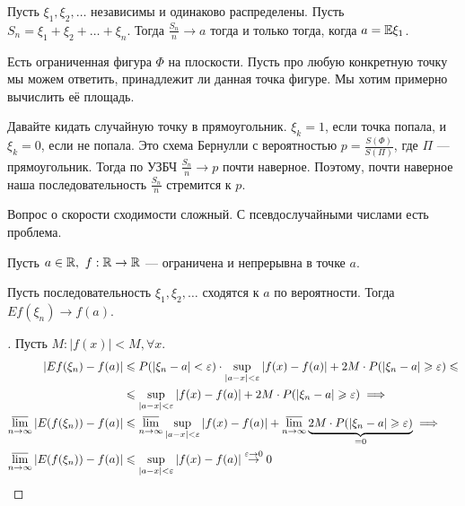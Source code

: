 \documentclass[../main.tex]{subfiles}
\begin{document}
\begin{thm}
 Пусть $ \xi_1, \xi_2, \ldots $  независимы и одинаково распределены. Пусть $ S_n  = \xi_1 + \xi_2 + \ldots + \xi_n $. Тогда $ \frac{S_n}{n} \to a $ тогда и только тогда, когда $ a = \mathbb E \xi_1 $.
\end{thm}

\begin{exmpl}
Есть ограниченная фигура $ \Phi $ на плоскости. Пусть про любую конкретную точку мы можем ответить, принадлежит ли данная точка фигуре. Мы хотим примерно вычислить её площадь.

 Давайте кидать случайную точку в прямоугольник. $ \xi_k = 1 $, если точка попала, и $ \xi_k = 0 $, если не попала. Это схема Бернулли с вероятностью $ p = \frac{S(\Phi)}{S(\Pi)} $, где $ \Pi $ --- прямоугольник. Тогда по УЗБЧ  $ \frac{S_n}{n} \to p $  почти наверное. Поэтому, почти наверное наша последовательность $ \frac{S_n}{n} $ стремится к $ p $.

 Вопрос о скорости сходимости сложный. С псевдослучайными числами есть проблема.
\end{exmpl}

\begin{thm}
	Пусть $a \in \mathbb{R}, \ f : \mathbb{R} \to \mathbb{R}$ --- ограничена и непрерывна в точке $a$.

	Пусть последовательность $\xi_1, \xi_2, \ldots$ сходятся к $a$ по вероятности.
	Тогда $E f(\xi_n) \to f(a)$.
\end{thm}
\begin{proof}[]
	Пусть $M: |f(x)| < M, \forall x$.
  \begin{align*}
	|E f(\xi_n) - f(a)| &\leqslant P(|\xi_n - a| < \varepsilon) \cdot \sup_{|a - x| < \varepsilon} |f(x) - f(a)| + 2M \cdot P(|\xi_n - a| \geqslant \varepsilon) \leqslant \\
	& \leqslant \sup_{|a - x| < \varepsilon} |f(x) - f(a)| + 2M \cdot P(|\xi_n - a| \geqslant \varepsilon) \implies \\
	\varlimsup_{n \to \infty} |E(f(\xi_n)) - f(a)| &\leqslant \varlimsup_{n \to \infty} \sup_{|a - x| < \varepsilon} |f(x) - f(a)| + \varlimsup_{n \to \infty} \underbrace{2M \cdot P(|\xi_n - a| \geqslant \varepsilon)}_{=0} \implies  \\
	\varlimsup_{n \to \infty} |E(f(\xi_n)) - f(a)| &\leqslant \sup_{|a - x| < \varepsilon} |f(x) - f(a)| \overset{\varepsilon \to 0}{\to} 0
  \end{align*}
\end{proof}
\end{document}
